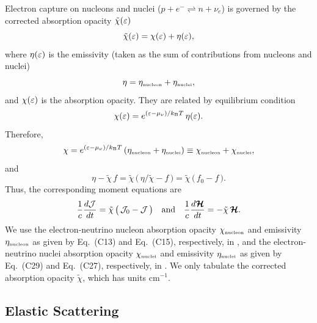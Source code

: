 \documentclass[10pt,preprint]{aastex}
\begin{document}
Electron capture on nucleons and nuclei ($p+e^{-}\rightleftharpoons n+\nu_{e}$) is governed by the corrected absorption opacity $\tilde{\chi}(\varepsilon)$ 
\begin{equation}
  \tilde{\chi}(\varepsilon) = \chi(\varepsilon) + \eta(\varepsilon), 
\end{equation}
where $\eta(\varepsilon)$ is the emissivity (taken as the sum of contributions from nucleons and nuclei)
\begin{equation}
  \eta = \eta_{\mbox{\tiny nucleon}} + \eta_{\mbox{\tiny nuclei}},
\end{equation}
and $ \chi(\varepsilon)$ is the absorption opacity.  
They are related by equilibrium condition
\begin{equation}
  \chi(\varepsilon) = e^{(\varepsilon-\mu_{\nu})/k_{\mbox{\tiny B}}T}\,\eta(\varepsilon). 
\end{equation}
Therefore,
\begin{equation}
  \chi = e^{(\varepsilon-\mu_{\nu})/k_{\mbox{\tiny B}}T}\,(\eta_{\mbox{\tiny nucleon}} + \eta_{\mbox{\tiny nuclei}}) 
  \equiv \chi_{\mbox{\tiny nucleon}} + \chi_{\mbox{\tiny nuclei}},
\end{equation}
and
\begin{equation}
  \eta-\tilde{\chi}\,f=\tilde{\chi}\,\big(\,\eta/\tilde{\chi}-f\,\big)=\tilde{\chi}\,\big(\,f_{0}-f\,\big).  
\end{equation}
Thus, the corresponding moment equations are
\begin{equation}
  \frac{1}{c}\frac{d \mathcal{J}}{d t}=\tilde{\chi}\,\big(\,\mathcal{J}_{0}-\mathcal{J}\,\big)
  \quad\text{and}\quad
  \frac{1}{c}\frac{d \boldsymbol{\mathcal{H}}}{d t}=-\tilde{\chi}\,\boldsymbol{\mathcal{H}}.  
\end{equation}
We use the electron-neutrino nucleon absorption opacity $\chi_{\mbox{\tiny nucleon}}$ and emissivity $\eta_{\mbox{\tiny nucleon}}$ as given by Eq.~(C13) and Eq.~(C15), respectively, in \citet{bruenn_1985}, and the electron-neutrino nuclei absorption opacity $\chi_{\mbox{\tiny nuclei}}$ and emissivity $\eta_{\mbox{\tiny nuclei}}$ as given by Eq.~(C29) and Eq.~(C27), respectively, in \citet{bruenn_1985}.  
We only tabulate the corrected absorption opacity $\tilde{\chi}$, which has units cm$^{-1}$.  

\subsection{Elastic Scattering}
\end{document}

